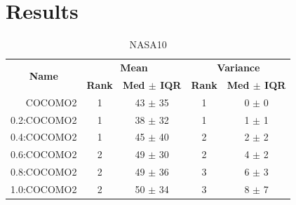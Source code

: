 \documentclass[final,twocolumn,5p]{elsarticle}
\begin{document}
 \section{Results}
 
 
 
\begin{table}[!htpb]
\centering
\caption{NASA10}
\scriptsize
\label{tab:nasa10}
\begin{tabular}{|r|c|c|c|c|}
\hline
\multicolumn{1}{|c|}{\multirow{2}{*}{\textbf{Name}}} & \multicolumn{2}{c|}{\textbf{Mean}}     & \multicolumn{2}{c|}{\textbf{Variance}} \\ \cline{2-5} 
\multicolumn{1}{|c|}{}                               & \textbf{Rank} & \textbf{Med $\pm$ IQR} & \textbf{Rank} & \textbf{Med $\pm$ IQR} \\ \hline
COCOMO2                                              & 1             & 43 $\pm$ 35            & 1             & 0 $\pm$ 0              \\
0.2:COCOMO2                                          & 1             & 38 $\pm$ 32            & 1             & 1 $\pm$ 1              \\ \cline{4-5}
0.4:COCOMO2                                          & 1             & 45 $\pm$ 40            & 2             & 2 $\pm$ 2              \\ \cline{2-3}
0.6:COCOMO2                                          & 2             & 49 $\pm$ 30            & 2             & 4 $\pm$ 2              \\ \cline{4-5}
0.8:COCOMO2                                          & 2             & 49 $\pm$ 36            & 3             & 6 $\pm$ 3              \\
1.0:COCOMO2                                          & 2             & 50 $\pm$ 34            & 3             & 8 $\pm$ 7    \\ \hline         
\end{tabular}
\end{table}
\end{document}
